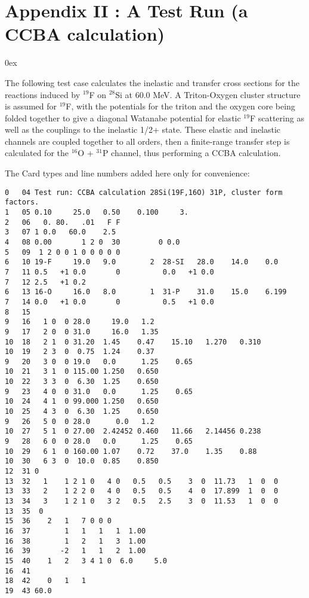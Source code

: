 \documentclass[11pt]{article}
\begin{document}
\newpage
\section*{Appendix II : A Test Run (a CCBA calculation)}
%
\bigskip
%
\hangindent 0ex


The following test case calculates the inelastic and transfer cross sections
for the reactions induced by $^{19}$F on $^{28}$Si at 60.0 MeV.   A Triton-Oxygen
cluster structure is assumed for $^{19}$F, with the potentials for the triton
and the oxygen core being folded together to give a diagonal Watanabe
potential for elastic $^{19}$F scattering as well as the couplings to the
inelastic 1/2+ state.
These elastic and inelastic channels are coupled together to all orders,
then a finite-range transfer step is calculated for the $^{16}$O + $^{31}$P channel,
thus performing a CCBA calculation.

The Card types and line numbers added here only for convenience:
\small
\begin{verbatim}
0   04 Test run: CCBA calculation 28Si(19F,16O) 31P, cluster form factors.
1   05 0.10     25.0   0.50    0.100     3.
2   06   0. 80.   .01   F F
3   07 1 0.0   60.0    2.5
4   08 0.00       1 2 0  30         0 0.0
5   09  1 2 0 0 1 0 0 0 0 0
6   10 19-F     19.0   9.0        2  28-SI   28.0    14.0    0.0
7   11 0.5   +1 0.0       0          0.0   +1 0.0
7   12 2.5   +1 0.2
6   13 16-O     16.0   8.0        1  31-P    31.0    15.0    6.199
7   14 0.0   +1 0.0       0          0.5   +1 0.0
8   15
9   16   1 0  0 28.0     19.0   1.2
9   17   2 0  0 31.0     16.0   1.35
10  18   2 1  0 31.20  1.45    0.47    15.10   1.270   0.310
10  19   2 3  0  0.75  1.24    0.37
9   20   3 0  0 19.0   0.0      1.25    0.65
10  21   3 1  0 115.00 1.250   0.650
10  22   3 3  0  6.30  1.25    0.650
9   23   4 0  0 31.0   0.0      1.25    0.65
10  24   4 1  0 99.000 1.250   0.650
10  25   4 3  0  6.30  1.25    0.650
9   26   5 0  0 28.0      0.0   1.2
10  27   5 1  0 27.00  2.42452 0.460   11.66   2.14456 0.238
9   28   6 0  0 28.0   0.0      1.25    0.65
10  29   6 1  0 160.00 1.07    0.72    37.0    1.35    0.88
10  30   6 3  0  10.0  0.85    0.850
12  31 0
13  32   1    1 2 1 0   4 0   0.5   0.5    3  0  11.73   1  0  0
13  33   2    1 2 2 0   4 0   0.5   0.5    4  0  17.899  1  0  0
13  34   3    1 2 1 0   3 2   0.5   2.5    3  0  11.53   1  0  0
13  35  0
15  36    2   1   7 0 0 0
16  37        1   1   1   1  1.00
16  38        1   2   1   3  1.00
16  39       -2   1   1   2  1.00
15  40    1   2   3 4 1 0  6.0     5.0
16  41
18  42    0   1   1
19  43 60.0
\end{verbatim}
\end{document}
